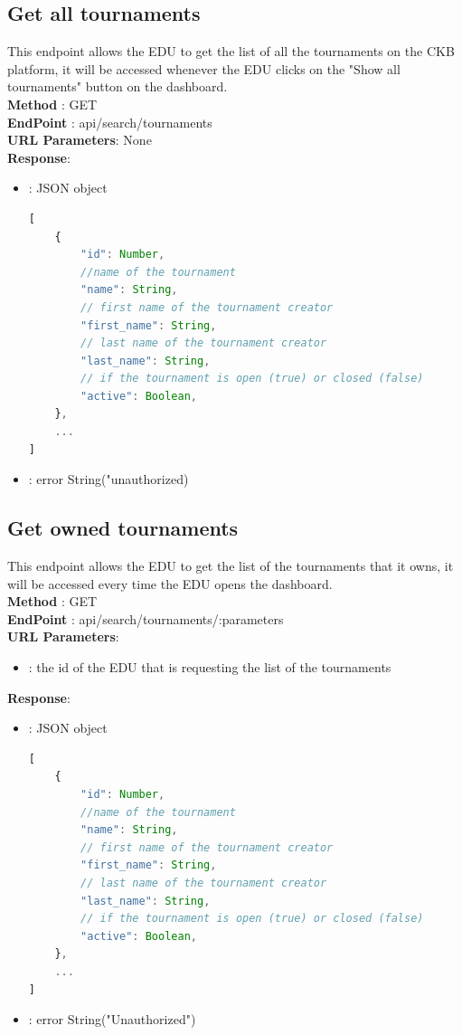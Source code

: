 \subsection*{Get all tournaments}
This endpoint allows the EDU to get the list of all the tournaments on the CKB platform, it will be accessed whenever the EDU clicks on the "Show all tournaments" button on the dashboard.\\
\textbf{Method} : GET \\
\textbf{EndPoint} : api/search/tournaments \\
\textbf{URL Parameters}: None \\
\textbf{Response}:
\begin{itemize}
    \item {} : JSON object
          \begin{lstlisting}[language=JavaScript, label={lst:jscode}, basicstyle=\ttfamily]
[
    {
        "id": Number,
        //name of the tournament
        "name": String,
        // first name of the tournament creator
        "first_name": String, 
        // last name of the tournament creator
        "last_name": String,
        // if the tournament is open (true) or closed (false)
        "active": Boolean,
    },
    ...
]
        \end{lstlisting}
    \item {}: error String("unauthorized)
\end{itemize}

\subsection*{Get owned tournaments}
This endpoint allows the EDU to get the list of the tournaments that it owns, it will be accessed every time the EDU opens the dashboard.\\

\textbf{Method} : GET \\
\textbf{EndPoint} : api/search/tournaments/:parameters \\
\textbf{URL Parameters}:
\begin{itemize}
    \item {}: the id of the EDU that is requesting the list of the tournaments
\end{itemize}
\textbf{Response}:
\begin{itemize}
    \item {} : JSON object
          \begin{lstlisting}[language=JavaScript, label={lst:jscode}, basicstyle=\ttfamily]
[
    {
        "id": Number,
        //name of the tournament
        "name": String,
        // first name of the tournament creator
        "first_name": String, 
        // last name of the tournament creator
        "last_name": String,
        // if the tournament is open (true) or closed (false)
        "active": Boolean,
    },
    ...
]
            \end{lstlisting}
    \item {} : error String("Unauthorized")
\end{itemize}

